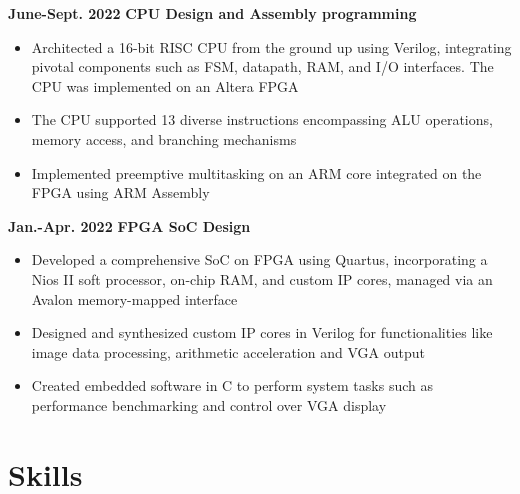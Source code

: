 \documentclass[11pt,a4paper,sans]{moderncv}
\begin{document}

\cventry
{\textnormal{\textbf{June-Sept. 2022}}}
{\textnormal{\textbf{CPU Design and Assembly programming}}}
{}{}{}
{
    \begin{itemize}
    \item Architected a 16-bit RISC CPU from the ground up using Verilog, integrating pivotal components such as FSM, datapath, RAM, and I/O interfaces. The CPU was implemented on an Altera FPGA
    \item The CPU supported 13 diverse instructions encompassing ALU operations, memory access, and branching mechanisms
    \item Implemented preemptive multitasking on an ARM core integrated on the FPGA using ARM Assembly
\end{itemize}
}

\cventry
{\textnormal{\textbf{Jan.-Apr. 2022}}}
{\textnormal{\textbf{FPGA SoC Design}}}
{}{}{}
{
    \begin{itemize}
    \item Developed a comprehensive SoC on FPGA using Quartus, incorporating a Nios II soft processor, on-chip RAM, and custom IP cores, managed via an Avalon memory-mapped interface
    \item Designed and synthesized custom IP cores in Verilog for functionalities like image data processing, arithmetic acceleration and VGA output
    \item Created embedded software in C to perform system tasks such as performance benchmarking and control over VGA display
    \end{itemize}
}

\section{Skills}
\end{document}
